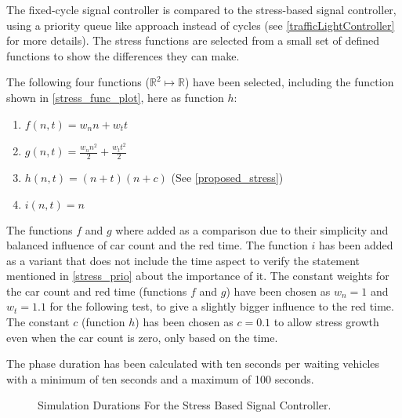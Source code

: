 The fixed-cycle signal controller is compared to the stress-based signal controller, using a priority queue like approach instead of cycles (see \autoref{trafficLightController} for more details). The stress functions are selected from a small set of defined functions to show the differences they can make.

The following four functions ($\mathbb{R}^2 \mapsto \mathbb{R}$) have been selected, including the function shown in \autoref{stress_func_plot}, here as function $h$:

\begin{enumerate}
	\item $f(n, t) = w_n n + w_tt$
	\item $g(n, t) = \frac{w_n n^2}{2} + \frac{w_t t^2}{2}$
	\item $h(n, t) = (n + t)(n + c)$ (See \autoref{proposed_stress})
	\item $i(n, t) = n$
\end{enumerate}

The functions $f$ and $g$ where added as a comparison due to their simplicity and balanced influence of car count and the red time. The function $i$ has been added as a variant that does not include the time aspect to verify the statement mentioned in \autoref{stress_prio} about the importance of it. The constant weights for the car count and red time (functions $f$ and $g$) have been chosen as $w_n = 1$ and $w_t = 1.1$ for the following test, to give a slightly bigger influence to the red time. The constant $c$ (function $h$) has been chosen as $c = 0.1$ to allow stress growth even when the car count is zero, only based on the time.

The phase duration has been calculated with ten seconds per waiting vehicles with a minimum of ten seconds and a maximum of 100 seconds.

\begin{figure}
\centering	
{}
\caption{Simulation Durations For the Stress Based Signal Controller.}
\label{stress_based_results}
\end{figure}

